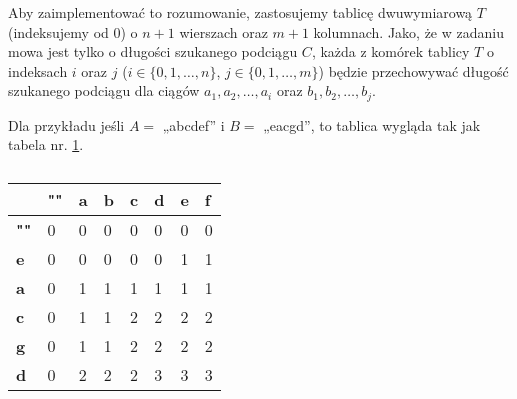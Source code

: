 Aby zaimplementować to rozumowanie, zastosujemy tablicę dwuwymiarową $T$ 
(indeksujemy od 0)
o $n+1$ wierszach oraz $m+1$ kolumnach. Jako, że w zadaniu mowa jest 
tylko o długości szukanego podciągu $C$, każda z komórek tablicy $T$ 
o indeksach $i$ oraz $j$ ($i \in \{0,1, \dots, n\}$, 
$j \in \{0,1, \dots, m\}$) będzie 
przechowywać długość szukanego podciągu dla ciągów 
$a_1, a_2, \dots, a_i$ oraz $b_1, b_2, \dots, b_j$. 

Dla przykładu 
jeśli $A = $ „abcdef” i  $B = $ „eacgd”, to tablica 
wygląda tak jak tabela nr. \ref{tab_zad12}.


\begin{table}[H]
	\center
	\begin{tabular}{|l|lllllll|}
		\hline
		& \multicolumn{1}{l|}{\textbf{""}} & \multicolumn{1}{l|}{\textbf{a}} & \multicolumn{1}{l|}{\textbf{b}} & \multicolumn{1}{l|}{\textbf{c}} & \multicolumn{1}{l|}{\textbf{d}} & \multicolumn{1}{l|}{\textbf{e}} & \multicolumn{1}{l|}{\textbf{f}} \\ \hline
		\textbf{""} & 0                                & 0                               & 0                               & 0                               & 0                               & 0                               & 0                               \\ \cline{1-1}
		\textbf{e}  & 0                                & 0                               & 0                               & 0                               & 0                               & 1                               & 1                               \\ \cline{1-1}
		\textbf{a}  & 0                                & 1                               & 1                               & 1                               & 1                               & 1                               & 1                               \\ \cline{1-1}
		\textbf{c}  & 0                                & 1                               & 1                               & 2                               & 2                               & 2                               & 2                               \\ \cline{1-1}
		\textbf{g}  & 0                                & 1                               & 1                               & 2                               & 2                               & 2                               & 2                               \\ \cline{1-1}
		\textbf{d}  & 0                                & 2                               & 2                               & 2                               & 3                               & 3                               & 3                               \\ \cline{1-1}
		\hline
	\end{tabular}
	\caption{}
	\label{tab_zad12}
\end{table}

